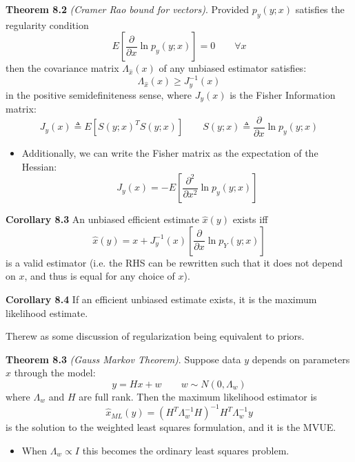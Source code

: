 \documentclass[12pt]{article} %
\begin{document}
\textbf{Theorem 8.2} \textit{(Cramer Rao bound for vectors)}. Provided $p_y(y;x)$ satisfies the regularity condition
\begin{equation*}
    E \left[ \frac{\partial}{\partial x} \ln p_y(y;x) \right] = 0 \qquad \forall x
\end{equation*}
then the covariance matrix $\Lambda_{\hat{x}}(x)$ of any unbiased estimator satisfies:
\begin{equation*}
    \Lambda_{\hat{x}}(x) \geq J_y^{-1}(x)
\end{equation*}
in the positive semidefiniteness sense, where $J_y(x)$ is the Fisher Information matrix:
\begin{equation*}
    J_y(x) \triangleq E[S(y;x)^TS(y;x)] \qquad S(y;x) \triangleq \frac{\partial}{\partial x} \ln p_y(y;x)
\end{equation*}
\begin{itemize}[topsep=-1pt]
    \item Additionally, we can write the Fisher matrix as the expectation of the Hessian: $$J_y(x) = - E\left[ \frac{\partial^2}{\partial x^2} \ln p_y(y;x) \right]$$
\end{itemize}

\textbf{Corollary 8.3} An unbiased efficient estimate $\hat{x}(y)$ exists iff 
\begin{equation*}
    \hat{x}(y) = x + J_y^{-1}(x) \left[ \frac{\partial}{\partial x} \ln p_Y(y;x) \right]
\end{equation*}
is a valid estimator (i.e. the RHS can be rewritten such that it does not depend on $x$, and thus is equal for any choice of $x$).


\textbf{Corollary 8.4} If an efficient unbiased estimate exists, it is the maximum likelihood estimate.

\separate
Therew as some discussion of regularization being equivalent to priors.

\textbf{Theorem 8.3} \textit{(Gauss Markov Theorem)}. Suppose data $y$ depends on parameters $x$ through the model:
\begin{equation*}
    y = Hx + w \qquad w \sim N(0,\Lambda_w)
\end{equation*}
where $\Lambda_w$ and $H$ are full rank. Then the maximum likelihood estimator is
\begin{equation*}
    \hat{x}_{ML}(y) = (H^T\Lambda_w^{-1}H)^{-1}H^T\Lambda_w^{-1}y
\end{equation*}
 is the solution to the weighted least squares formulation, and it is the MVUE.
\begin{itemize}[topsep=-1pt]
    \item When $\Lambda_w \propto I$ this becomes the ordinary least squares problem.
\end{itemize}
\end{document}
